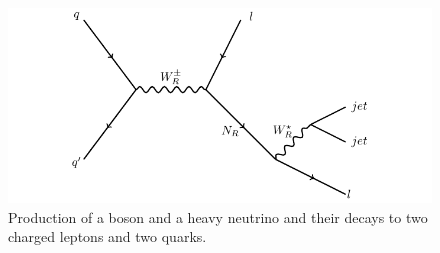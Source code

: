 \begin{figure}[h]
	\centering
	\includegraphics[width=1.0\textwidth]{figures/feynman.pdf}
	\caption{Production of a \WR boson and a heavy neutrino \nul and their decays to two charged leptons and two quarks.}
	\label{fig:wrFeynmanDiagram}
\end{figure}


